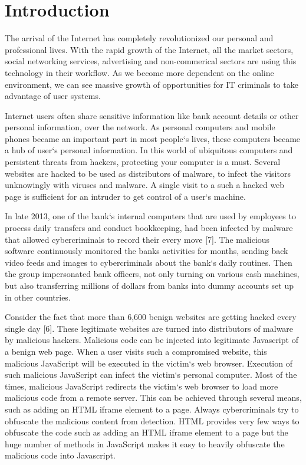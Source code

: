 \chapter{Introduction}

The arrival of the Internet has completely revolutionized our personal and professional lives. With the rapid growth of the Internet, all the market sectors, social networking services, advertising and non-commerical sectors are using this technology in their workflow. As we become more dependent on the online environment, we can see massive growth of opportunities for IT criminals to take advantage of user systems. 

Internet users often share sensitive information like bank account details or other personal information, over the network. As personal computers and mobile phones became an important part in most people`s lives, these computers became a hub of user`s personal information. In this world of ubiquitous computers and persistent threats from hackers, protecting your computer is a must. Several websites are hacked to be used as distributors of malware, to infect the visitors unknowingly with viruses and malware. A single visit to a such a hacked web page is sufficient for an intruder to get control of a user`s machine.

In late 2013, one of the bank`s internal computers that are used by employees to process daily transfers and conduct bookkeeping, had been infected by malware that allowed cybercriminals to record their every move [7]. The malicious software continuously monitored the banks activities for months, sending back video feeds and images to cybercriminals about the bank`s daily routines. Then the group impersonated bank officers, not only turning on various cash machines, but also transferring millions of dollars from banks into dummy accounts set up in other countries.

Consider the fact that more than 6,600 benign websites are getting hacked every single day [6]. These legitimate websites are turned into distributors of malware by malicious hackers. Malicious code can be injected into legitimate Javascript of a benign web page. When a user visits such a compromised website, this malicious JavaScript will be executed in the victim`s web browser. Execution of such malicious JavaScript can infect the victim`s personal computer. Most of the times, malicious JavaScript redirects the victim`s web browser to load more malicious code from a remote server. This can be achieved through several means, such as adding an HTML iframe element to a page. Always cybercriminals try to obfuscate the malicious content from detection. HTML provides very few ways to obfuscate the code such as adding an HTML iframe element to a page but the huge number of methods in JavaScript makes it easy to heavily obfuscate the malicious code into Javascript.

